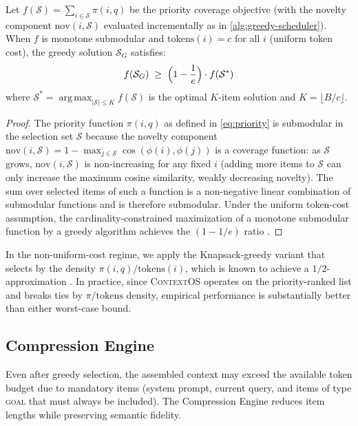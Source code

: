 \documentclass[review,12pt]{elsarticle}
\newcommand{\contextos}{\textsc{ContextOS}}
\DeclareMathOperator*{\argmax}{arg\,max}
\newcommand{\prio}{\pi}
\newcommand{\nov}{\mathrm{nov}}
\newcommand{\tokens}{\mathrm{tokens}}
\begin{document}
\begin{theorem}
\label{thm:greedy}
Let $f(\mathcal{S}) = \sum_{i \in \mathcal{S}} \prio(i, q)$ be the priority
coverage objective (with the novelty component $\nov(i, \mathcal{S})$
evaluated incrementally as in \cref{alg:greedy-scheduler}).  When $f$ is
monotone submodular and $\tokens(i) = c$ for all $i$ (uniform token cost),
the greedy solution $\mathcal{S}_G$ satisfies:
\begin{equation}
  f(\mathcal{S}_G) \;\geq\; \Bigl(1 - \frac{1}{e}\Bigr) \cdot f(\mathcal{S}^*)
  \label{eq:greedy-bound}
\end{equation}
where $\mathcal{S}^* = \argmax_{|\mathcal{S}| \leq K} f(\mathcal{S})$ is the
optimal $K$-item solution and $K = \lfloor B / c \rfloor$.
\end{theorem}
\begin{proof}
The priority function $\prio(i, q)$ as defined in \cref{eq:priority} is
submodular in the selection set $\mathcal{S}$ because the novelty component
$\nov(i, \mathcal{S}) = 1 - \max_{j \in \mathcal{S}} \cos(\phi(i), \phi(j))$
is a coverage function: as $\mathcal{S}$ grows, $\nov(i, \mathcal{S})$ is
non-increasing for any fixed $i$ (adding more items to $\mathcal{S}$ can only
increase the maximum cosine similarity, weakly decreasing novelty).  The
sum over selected items of such a function is a non-negative linear combination
of submodular functions and is therefore submodular.  Under the uniform
token-cost assumption, the cardinality-constrained maximization of a monotone
submodular function by a greedy algorithm achieves the $(1 - 1/e)$ ratio
\citep{nemhauser1978analysis}.
\end{proof}

In the non-uniform-cost regime, we apply the Knapsack-greedy variant that
selects by the density $\prio(i, q) / \tokens(i)$, which is known to
achieve a $1/2$-approximation \citep{sviridenko2004note}.  In practice,
since \contextos{} operates on the priority-ranked list and breaks ties by
$\prio/\tokens$ density, empirical performance is substantially better than
either worst-case bound.

\subsection{Compression Engine}
\label{subsec:compression}

Even after greedy selection, the assembled context may exceed the available
token budget due to mandatory items (system prompt, current query, and items
of type \textsc{goal} that must always be included).  The Compression Engine
reduces item lengths while preserving semantic fidelity.
\end{document}

